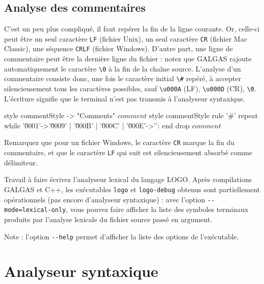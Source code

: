 \subsection{Analyse des commentaires}
C'est un peu plus compliqué, il faut repérer la fin de la ligne courante. Or, celle-ci peut être un seul caractère \texttt{LF} (fichier Unix), un seul caractère \texttt{CR} (fichier Mac Classic), une séquence \texttt{CRLF} (fichier Windows). D'autre part, une ligne de commentaire peut être la dernière ligne du fichier : notez que GALGAS rajoute automatiquement le caractère \texttt{\textquotesingle\textbackslash 0\textquotesingle} à la fin de la chaîne source. L'analyse d'un commentaire consiste donc, une fois le caractère initial \texttt{\textquotesingle\textbackslash\#\textquotesingle} repéré, à accepter silencieusement tous les caractères possibles, sauf \texttt{\textquotesingle\textbackslash u000A\textquotesingle} (LF), \texttt{\textquotesingle\textbackslash u000D\textquotesingle} (CR), \texttt{\textquotesingle\textbackslash0\textquotesingle}. L’écriture  signifie que le terminal  n’est pas transmis à l’analyseur syntaxique.

\begin{galgascode}
style commentStyle -> "Comments"
$comment$ style commentStyle %
rule '#' {
  repeat
  while '\u0001'->'\u0009' | '\u000B' | '\u000C' | '\u000E'->'\uFFFD':
  end
  drop $comment$
}
\end{galgascode}

Remarquez que pour un fichier Windows, le caractère \texttt{CR} marque la fin du commentaire, et que le caractère \texttt{LF} qui suit est silencieusement absorbé comme délimiteur.

Travail à faire
écrivez l'analyseur lexical du langage LOGO. Après compilations GALGAS et C++, les exécutables \texttt{logo} et \texttt{logo-debug} obtenus sont partiellement opérationnels (pas encore d’analyseur syntaxique) : avec l'option \texttt{-{}-mode=lexical-only}, vous pouvez faire afficher la liste des symboles terminaux produite par l'analyse lexicale du fichier source passé en argument.

Note : l'option \texttt{-{}-help} permet d'afficher la liste des options de l'exécutable. 

\section{Analyseur syntaxique}

